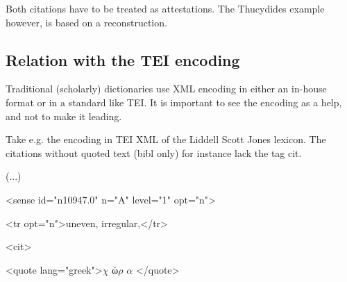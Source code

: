 \documentclass[10pt]{article}
\begin{document}

\par



 Both citations have to be treated as attestations. The Thucydides example however, is based on a reconstruction.

\newpage
\subsection*{Relation with the TEI encoding}
 Traditional (scholarly) dictionaries use XML encoding in either an in-house format or in a standard like TEI. It is important to see the encoding as a help, and not to make it leading.\par

 Take e.g. the encoding in TEI XML of the Liddell Scott Jones lexicon. The citations without quoted text (bibl only) for instance lack the tag cit.\par



\begin{adjustwidth}{0.71in}{0.0in}
 (...)\par

\end{adjustwidth}

\begin{adjustwidth}{0.71in}{0.0in}
 <sense id="n10947.0" n="A" level="1" opt="n">\par

\end{adjustwidth}

\begin{adjustwidth}{0.85in}{0.0in}
 <tr opt="n">uneven, irregular,</tr>\par

\end{adjustwidth}

\begin{adjustwidth}{0.85in}{0.0in}
 <cit>\par

\end{adjustwidth}

\begin{adjustwidth}{0.99in}{0.0in}
 <quote lang="greek">$ \chi $ ώ$ \rho $ $ \alpha $ </quote>\par

\end{adjustwidth}
\end{document}
